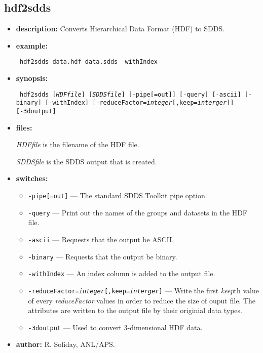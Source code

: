 %
\newpage
\subsection{hdf2sdds}
\label{hdf2sdds}

\begin{itemize}
\item {\bf description:} Converts Hierarchical Data Format (HDF) to SDDS.
\item {\bf example:} 
\begin{flushleft}{\tt
hdf2sdds data.hdf data.sdds -withIndex
}\end{flushleft}
\item {\bf synopsis:}
\begin{flushleft}{\tt
hdf2sdds [{\em HDFfile}] [{\em SDDSfile}] [-pipe[=out]]
[-query] [-ascii] [-binary] [-withIndex] [-reduceFactor={\em integer}[,keep={\em interger}]] [-3doutput]
}\end{flushleft}
\item {\bf files: }

{\em HDFfile} is the filename of the HDF file.

{\em SDDSfile} is the SDDS output that is created.

\item {\bf switches:}
\begin{itemize}
    \item {\tt -pipe[=out]} --- The standard SDDS Toolkit pipe option.
    \item {\tt -query} --- Print out the names of the groups and datasets in the HDF file.
    \item {\tt -ascii} --- Requests that the output be ASCII.
    \item {\tt -binary} --- Requests that the output be binary.
    \item {\tt -withIndex} --- An index column is added to the output file.
    \item {\tt -reduceFactor={\em integer}[,keep={\em interger}]} --- Write the first {\em keep}th value of every {\em reduceFactor} values in order to reduce the size of ouput file. The attributes are written to the output file by their originial data types.
    \item {\tt -3doutput} --- Used to convert 3-dimensional HDF data.
\end{itemize}
\item {\bf author:} R. Soliday, ANL/APS.
\end{itemize}
